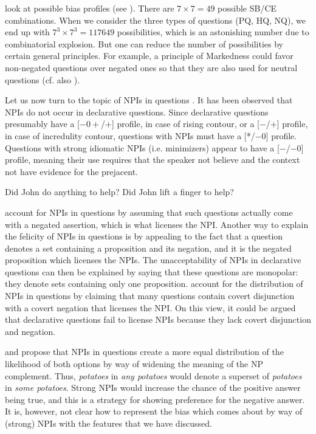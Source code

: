 \documentclass[output=paper,colorlinks,citecolor=brown]{langscibook}
\begin{document}
\citet{gartnergyuris2017delimiting} look at possible bias profiles (see ). There are $7 \times 7 = 49$ possible SB/CE combinations. When we consider the three types of questions (PQ, HQ, NQ), we end up with $7^3 \times 7^3 = 117649$ possibilities, which is an astonishing number due to combinatorial explosion. But one can reduce the number of possibilities by certain general principles. %
For example, a principle of Markedness could favor non-negated questions over negated ones so that they are also used for neutral questions (cf. also \citealt[230]{trinh2014how}). 

Let us now turn to the topic of NPIs in questions \citep{Ladusaw:1979, Kadmon:1993, krifka1995semantics, vanRooy:2003}. It has been observed that NPIs do not occur in declarative questions. Since declarative questions presumably have a [$-0+$/$+$] profile, in case of rising contour, or a [$-$/$+$] profile, in case of incredulity contour, questions with NPIs must have a [*/$-$0] profile. Questions with strong idiomatic NPIs (i.e. minimizers) appear to have a [$-$/$-0$] profile, meaning their use requires that the speaker not believe and the context not have evidence for the prejacent.

\ea
\ea
Did John do anything to help?
\ex
Did John lift a finger to help?
\z
\z

\citet{asherreese2005negative} account for NPIs in questions by assuming that such questions actually come with a negated assertion, which is what licenses the NPI. Another way to explain the felicity of NPIs in questions is by appealing to the fact that a question denotes a set containing a proposition and its negation, and it is the negated proposition which licenses the NPIs. The unacceptability of NPIs in declarative questions can then be explained by saying that these questions are monopolar: they denote sets containing only one proposition. \citet{guerzoni2014} account for the distribution of NPIs in questions by claiming that many questions contain covert disjunction with a covert negation that licenses the NPI. On this view, it could be argued that declarative questions fail to license NPIs because they lack covert disjunction and negation. 

\citet{krifka1995semantics} and \citet{vanRooy:2003} propose that NPIs in questions create a more equal distribution of the likelihood of both options by way of widening the meaning of the NP complement. Thus, \textit{potatoes} in \textit{any potatoes} would denote a superset of \textit{potatoes} in \textit{some potatoes}. Strong NPIs would increase the chance of the positive answer being true, and this is a strategy for showing preference for the negative answer. It is, however, not clear how to represent the bias which comes about by way of (strong) NPIs with the features that we have discussed. %
\end{document}
